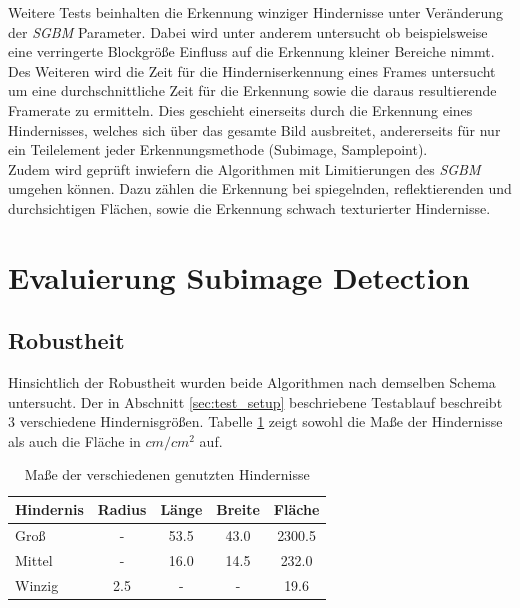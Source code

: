 \noindent
Weitere Tests beinhalten die Erkennung winziger Hindernisse unter Veränderung der \emph{SGBM} Parameter. Dabei wird unter anderem untersucht ob beispielsweise eine verringerte Blockgröße Einfluss auf die Erkennung kleiner Bereiche nimmt. Des Weiteren wird die Zeit für die Hinderniserkennung eines Frames untersucht um eine durchschnittliche Zeit für die Erkennung sowie die daraus resultierende Framerate zu ermitteln. Dies geschieht einerseits durch die Erkennung eines Hindernisses, welches sich über das gesamte Bild ausbreitet, andererseits für nur ein Teilelement jeder Erkennungsmethode (Subimage, Samplepoint).\\
Zudem wird geprüft inwiefern die Algorithmen mit Limitierungen des \emph{SGBM} umgehen können. Dazu zählen die Erkennung bei spiegelnden, reflektierenden und durchsichtigen Flächen, sowie die Erkennung schwach texturierter Hindernisse.\\

\section{Evaluierung Subimage Detection}
\label{sec:evaluierung_subimage}


    \subsection{Robustheit}
    \label{subsec:subimage_robustheit}
    
    Hinsichtlich der Robustheit wurden beide Algorithmen nach demselben Schema untersucht. Der in Abschnitt \ref{sec:test_setup} beschriebene Testablauf beschreibt 3 verschiedene Hindernisgrößen. Tabelle \ref{tbl:obstacle_sizes} zeigt sowohl die Maße der Hindernisse als auch die Fläche in $cm/cm^2$ auf.
    
	\begin{table}[h]
	\centering
	\begin{tabular}{|l|c|c|c|c|}
	\hline
	Hindernis   & Radius & Länge & Breite & Fläche \\
	\hline
	Groß   		&   -    & 53.5  & 43.0   & 2300.5 \\
	\hline
	Mittel 		& 	-    & 16.0  & 14.5   & 232.0\\
	\hline
	Winzig		& 2.5	 &   -   &   -    & 19.6 \\
	\hline	
	\end{tabular}
	\label{tbl:obstacle_sizes}
	\caption{Maße der verschiedenen genutzten Hindernisse}
	\end{table}
	
